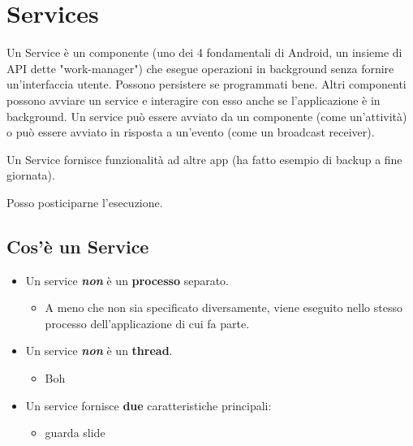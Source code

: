 
\chapter{Services}
\par Un Service è un componente (uno dei 4 fondamentali di Android, un insieme di API dette "work-manager") che esegue operazioni in background senza fornire un'interfaccia utente. Possono persistere se programmati bene. Altri componenti possono avviare un service e interagire con esso anche se l'applicazione è in background. Un service può essere avviato da un componente (come un'attività) o può essere avviato in risposta a un'evento (come un broadcast receiver).
\par Un Service fornisce funzionalità ad altre app (ha fatto esempio di backup a fine giornata).
\par Posso posticiparne l'esecuzione.

\section{Cos'è un Service}
\begin{itemize}
    \item Un service \textbf{\textit{non}} è un \textbf{processo} separato.
    \begin{itemize}
        \item A meno che non sia specificato diversamente, viene eseguito nello stesso processo dell'applicazione di cui fa parte.
    \end{itemize}
    \item Un service \textbf{\textit{non}} è un \textbf{thread}.
    \begin{itemize}
        \item Boh
    \end{itemize}
    \item Un service fornisce \textbf{due} caratteristiche principali:
    \begin{itemize}
        \item guarda slide
    \end{itemize}
\end{itemize}



